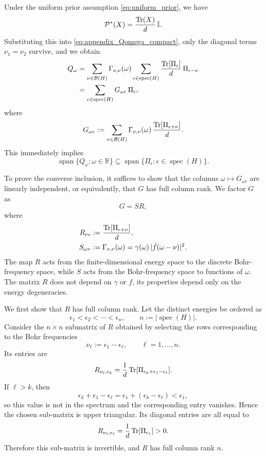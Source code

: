 \documentclass[showpacs,amsmath,amssymb,twocolumn,prx,superscriptaddress,10pt,aps,nofootinbib]{revtex4-2}
\newcommand{\bbI}{\mathbb{I}}
\newcommand{\vspan}{\operatorname{span}}
\begin{document}
Under the uniform prior assumption \eqref{eq:uniform_prior}, we have
\[
\mathcal P^*(X)=\frac{\Tr(X)}{d}\,\bbI.
\]
Substituting this into \eqref{eq:appendix_Qomega_compact}, only the diagonal terms \(\nu_1=\nu_2\) survive, and we obtain
\begin{align}
\label{eq:appendix_Qomega_G}
    Q_{\omega}
    &=
    \sum_{\nu\in\mathcal B(H)} \Gamma_{\nu,\nu}(\omega)
    \sum_{\epsilon\in\operatorname{spec}(H)}
    \frac{\Tr[\Pi_{\epsilon}]}{d}\,\Pi_{\epsilon-\nu} \nonumber \\
    &= 
    \sum_{\epsilon\in\operatorname{spec}(H)} G_{\omega\epsilon}\,\Pi_{\epsilon},
\end{align}
where
\begin{equation}
\label{eq:appendix_G_kernel}
    G_{\omega\epsilon}
    :=
    \sum_{\nu\in\mathcal B(H)}
    \Gamma_{\nu,\nu}(\omega)\,
    \frac{\Tr[\Pi_{\epsilon+\nu}]}{d}.
\end{equation}
This immediately implies
\begin{equation}
\label{eq:appendix_first_inclusion}
    \vspan\{Q_{\omega}:\omega\in\mathbb R\}
    \subseteq
    \vspan\{\Pi_{\epsilon}:\epsilon\in\operatorname{spec}(H)\}.
\end{equation}

To prove the converse inclusion, it suffices to show that the columns \(\omega\mapsto G_{\omega\epsilon}\) are linearly independent, or equivalently, that \(G\) has full column rank. We factor \(G\) as
\begin{equation}
\label{eq:appendix_G_factorization}
    G = S R,
\end{equation}
where
\begin{align}
\label{eq:appendix_RS_def}
    R_{\nu\epsilon}&:=\frac{\Tr[\Pi_{\epsilon+\nu}]}{d}, \\
    S_{\omega\nu}&:=\Gamma_{\nu,\nu}(\omega)
    =\gamma(\omega)\,|\hat f(\omega-\nu)|^2.
\end{align}
The map \(R\) acts from the finite-dimensional energy space to the discrete Bohr-frequency space, while \(S\) acts from the Bohr-frequency space to functions of \(\omega\). The matrix $R$ does not depend on $\gamma$ or $f$, its properties depend only on the energy degeneracies.

We first show that \(R\) has full column rank. Let the distinct energies be ordered as
\[
\epsilon_1<\epsilon_2<\cdots<\epsilon_n,
\qquad
n:=|\operatorname{spec}(H)|.
\]
Consider the \(n\times n\) submatrix of \(R\) obtained by selecting the rows corresponding to the Bohr frequencies
\[
\nu_\ell:=\epsilon_1-\epsilon_\ell,
\qquad
\ell=1,\dots,n.
\]
Its entries are
\[
R_{\nu_\ell,\epsilon_k}
=
\frac{1}{d}\Tr[\Pi_{\epsilon_k+\epsilon_1-\epsilon_\ell}].
\]
If \(\ell>k\), then
\[
\epsilon_k+\epsilon_1-\epsilon_\ell
=
\epsilon_1+(\epsilon_k-\epsilon_\ell)
<\epsilon_1,
\]
so this value is not in the spectrum and the corresponding entry vanishes. Hence the chosen sub-matrix is upper triangular. Its diagonal entries are all equal to
\[
R_{\nu_\ell,\epsilon_\ell}
=
\frac{1}{d}\Tr[\Pi_{\epsilon_1}]>0.
\]
Therefore this sub-matrix is invertible, and \(R\) has full column rank \(n\).
\end{document}
